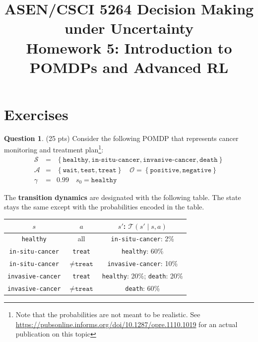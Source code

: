 \documentclass{article}
\title{ASEN/CSCI 5264 Decision Making under Uncertainty\\
       Homework 5: Introduction to POMDPs and Advanced RL}
\theoremstyle{definition}
\newtheorem{question}[thm]{Question}
\newcommand{\ttt}[1]{\texttt{#1}}
\begin{document}
\maketitle

\section{Exercises}

\begin{question}
    (25 pts) Consider the following POMDP that represents cancer monitoring and treatment plan\footnote{Note that the probabilities are not meant to be realistic. See \url{https://pubsonline.informs.org/doi/10.1287/opre.1110.1019} for an actual publication on this topic}:
\begin{eqnarray*}
    \mathcal{S} &=& \left\{\texttt{healthy}, \texttt{in-situ-cancer}, \texttt{invasive-cancer}, \texttt{death}\right\}\\
    \mathcal{A} &=& \left\{\texttt{wait}, \texttt{test}, \texttt{treat}\right\} \quad \mathcal{O} = \left\{\texttt{positive}, \texttt{negative}\right\}\\
    \gamma &=& 0.99 \quad
    s_0 = \texttt{healthy}
\end{eqnarray*}

The \textbf{transition dynamics} are designated with the following table. The state stays the same except with the probabilities encoded in the table.
\begin{center}
\begin{tabular}{ccc}
    \toprule
    $s$ & $a$ & $s'$: $\mathcal{T}(s' \mid s, a)$ \\
    \midrule
    \ttt{healthy} & all & \ttt{in-situ-cancer}: 2\% \\
    \ttt{in-situ-cancer} & \ttt{treat} & \ttt{healthy}: 60\% \\
    \ttt{in-situ-cancer} & $\neq\ttt{treat}$ & \ttt{invasive-cancer}: 10\% \\
    \ttt{invasive-cancer} & \ttt{treat} & \ttt{healthy}: 20\%; \ttt{death}: 20\% \\
    \ttt{invasive-cancer} & $\neq\ttt{treat}$ & \ttt{death}: 60\% \\
    \bottomrule
\end{tabular}
\end{center}


\end{question}
\end{document}
